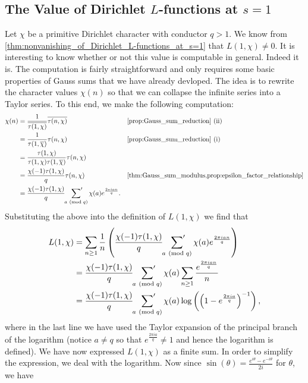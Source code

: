 \documentclass[12pt]{book}
\theoremstyle{definition}\newframedtheorem{method}{Method}
\newcommand{\psum}{\sideset{}{'}\sum}
\newcommand{\tmod}[1]{\ \left(\text{mod }#1\right)}
\renewcommand{\t}{\theta}
\newcommand{\<}{\langle}
\renewcommand{\>}{\rangle}
\newcommand{\conj}{\overline}
\newcommand{\cchi}{\conj{\chi}}
\begin{document}
    \subsection*{The Value of Dirichlet \texorpdfstring{$L$}{L}-functions at \texorpdfstring{$s = 1$}{s = 1}}
      Let $\chi$ be a primitive Dirichlet character with conductor $q > 1$. We know from \cref{thm:nonvanishing_of_Dirichlet_L-functions_at_s=1} that $L(1,\chi) \neq 0$. It is interesting to know whether or not this value is computable in general. Indeed it is. The computation is fairly straightforward and only requires some basic properties of Gauss sums that we have already devloped. The idea is to rewrite the character values $\chi(n)$ so that we can collapse the infinite series into a Taylor series. To this end, we make the following computation:
      \begin{align*}
        \chi(n) &= \frac{1}{\conj{\tau(1,\chi)}}\conj{\tau(n,\chi)} && \text{\cref{prop:Gauss_sum_reduction} (ii)} \\
        &= \frac{1}{\tau(1,\cchi)}\tau(n,\chi) && \text{\cref{prop:Gauss_sum_reduction} (i)} \\
        &= \frac{\tau(1,\chi)}{\tau(1,\chi)\tau(1,\cchi)}\tau(n,\chi) \\
        &= \frac{\chi(-1)\tau(1,\chi)}{q}\tau(n,\chi) && \text{\cref{thm:Gauss_sum_modulus,prop:epsilon_factor_relationship}} \\
        &= \frac{\chi(-1)\tau(1,\chi)}{q}\psum_{a \tmod{q}}\chi(a)e^{\frac{2\pi ian}{q}}.
      \end{align*}
      Substituting the above into the definition of $L(1,\chi)$ we find that
      \begin{align*}
        L(1,\chi) &= \sum_{n \ge 1}\frac{1}{n}\left(\frac{\chi(-1)\tau(1,\chi)}{q}\psum_{a \tmod{q}}\chi(a)e^{\frac{2\pi ian}{q}}\right) \\
        &= \frac{\chi(-1)\tau(1,\chi)}{q}\psum_{a \tmod{q}}\chi(a)\sum_{n \ge 1}\frac{e^{\frac{2\pi ian}{q}}}{n} \\
        &= \frac{\chi(-1)\tau(1,\chi)}{q}\psum_{a \tmod{q}}\chi(a)\log\left(\left(1-e^{\frac{2\pi ia}{q}}\right)^{-1}\right),
      \end{align*}
      where in the last line we have used the Taylor expansion of the principal branch of the logarithm (notice $a \neq q$ so that $e^{\frac{2\pi ia}{q}} \neq 1$ and hence the logarithm is defined). We have now expressed $L(1,\chi)$ as a finite sum. In order to simplify the expression, we deal with the logarithm. Now since $\sin(\t) = \frac{e^{i\t}-e^{-i\t}}{2i}$ for $\t$, we have
\end{document}
